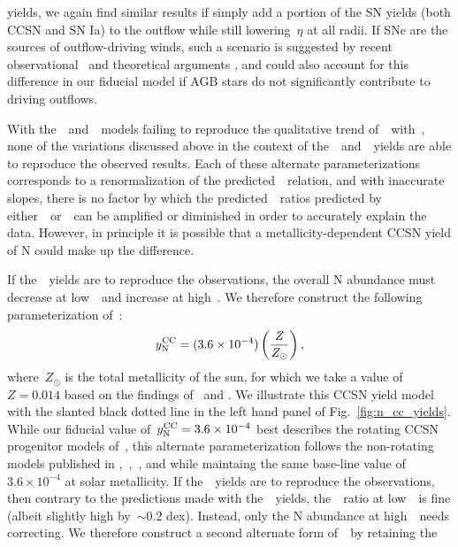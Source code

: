 \documentclass[ms.tex]{subfiles}
\begin{document}
yields, we again find similar results if simply add a portion of the SN yields
(both CCSN and SN Ia) to the outflow while still lowering~$\eta$ at all radii.
If SNe are the sources of outflow-driving winds, such a scenario is suggested
by recent observational~\citep*{Chisholm2018} and theoretical arguments
\citep{Christensen2018}, and could also account for this difference in our
fiducial model if AGB stars do not significantly contribute to driving outflows.
\par
With the~\karakasten~and~\karakas~models failing to reproduce the qualitative
trend of~\no~with~\oh, none of the variations discussed above in the
context of the~\cristallo~and~\ventura~yields are able to reproduce the
observed results.
Each of these alternate parameterizations corresponds to a renormalization of
the predicted~\ohno~relation, and with inaccurate slopes, there is no factor by
which the predicted~\no~ratios predicted by either~\karakasten~or~\karakas~can
be amplified or diminished in order to accurately explain the data.
However, in principle it is possible that a metallicity-dependent CCSN yield of
N could make up the difference.
\par
If the~\karakasten~yields are to reproduce the observations, the overall N
abundance must decrease at low~\oh~and increase at high~\oh.
We therefore construct the following parameterization of~:
\begin{equation}
y_\text{N}^\text{CC} = (3.6\times10^{-4})\left(\frac{Z}{Z_\odot}\right),
\label{eq:linear_yncc}
\end{equation}
where~$Z_\odot$ is the total metallicity of the sun, for which we take a value
of~$Z = 0.014$ based on the findings of~\citet{Asplund2009} and
\citet*{Asplund2021}.
We illustrate this CCSN yield model with the slanted black dotted line in the
left hand panel of Fig.~\ref{fig:n_cc_yields}.
While our fiducial value of~$y_\text{N}^\text{CC} = 3.6\times10^{-4}$ best describes the
rotating CCSN progenitor models of~\citet{Limongi2018}, this alternate
parameterization follows the non-rotating models published in
\citet{Limongi2018},~\citet{Sukhbold2016},~\citet{Nomoto2013}, and
\citet{Woosley1995} while maintaing the same base-line value of
$3.6\times10^{-4}$ at solar metallicity.
If the~\karakas~yields are to reproduce the observations, then contrary to the
predictions made with the~\karakasten~yields, the~\no~ratio at low~\oh~is
fine (albeit slightly high by~$\sim$0.2 dex).
Instead, only the N abundance at high~\oh~needs correcting.
We therefore construct a second alternate form of~~by retaining the
\end{document}
